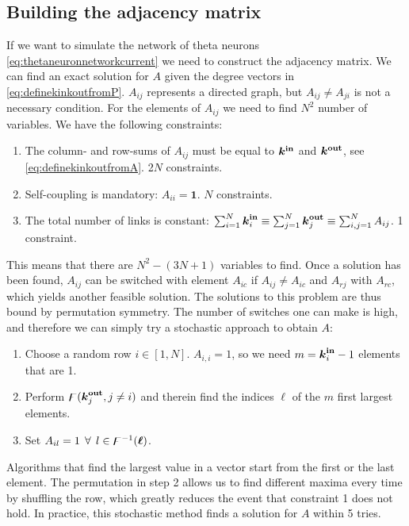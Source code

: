 \subsection{Building the adjacency matrix} \label{sec:buildingA}
If we want to simulate the network of theta neurons \eqref{eq:thetaneuronnetworkcurrent} we need to construct the adjacency matrix. We can find an exact solution for $A$ given the degree vectors in \eqref{eq:definekinkoutfromP}. $A_{ij}$ represents a directed graph, but $A_{ij} \neq A_{ji}$ is not a necessary condition. For the elements of $A_{ij}$ we need to find $N^2$ number of variables. We have the following constraints:
\begin{enumerate}
\item The column- and row-sums of $A_{ij}$ must be equal to ${\boldsymbol{k^{\rm in}}}$ and $\boldsymbol{{k^{\rm out}}}$, see \eqref{eq:definekinkoutfromA}. 2$N$ constraints.
\item Self-coupling is mandatory: $A_{ii} = \boldsymbol{1}$. $N$ constraints. \cite{OttAntonsen2017}
\item The total number of links is constant: $\sum_{i=1}^{N} {\boldsymbol{k}_i^{\bf in}} \equiv \sum_{j=1}^{N} {\boldsymbol{k}_j^{\bf out}} \equiv \sum_{i,j=1}^{N}A_{i j}$. 1 constraint.
\end{enumerate}
This means that there are $N^2 - (3N + 1)$ variables to find. Once a solution has been found, $A_{ij}$ can be switched with element $A_{ic}$ if $A_{ij} \neq A_{ic}$ and $A_{rj}$ with $A_{rc}$, which yields another feasible solution. The solutions to this problem are thus bound by permutation symmetry. The number of switches one can make is high, and therefore we can simply try a stochastic approach to obtain $A$:
\begin{enumerate}
\item Choose a random row $i \in [1,N]$. $A_{i,i} = 1$, so we need $m = {\boldsymbol{k}_i^{\bf in}} - 1$ elements that are 1.
\item Perform ${\digamma} ( {\boldsymbol{k}_j^{\bf out}}, j \neq i)$ and therein find the indices $\boldsymbol{\ell}$ of the $m$ first largest elements. 
\item Set $A_{il} = 1 \: \: \forall \: \: l \in {\digamma^{-1}} (\boldsymbol{\ell})$.
\end{enumerate}
Algorithms that find the largest value in a vector start from the first or the last element. The permutation in step 2 allows us to find different maxima every time by shuffling the row, which greatly reduces the event that constraint 1 does not hold. In practice, this stochastic method finds a solution for $A$ within 5 tries.

